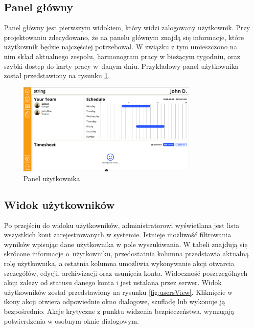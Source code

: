 \subsection{Panel główny}

Panel główny jest pierwszym widokiem, który widzi zalogowany użytkownik. Przy projektowaniu zdecydowano, że na panelu głównym znajdą się informacje, które użytkownik będzie najczęściej potrzebował. W związku z tym umieszczono na nim skład aktualnego zespołu, harmonogram pracy w bieżącym tygodniu, oraz szybki dostęp do karty pracy w~danym dniu. Przykładowy panel użytkownika został przedstawiony na rysunku \ref{fig:userDashboard}.

\begin{figure}[H]
    \centering
    \includegraphics[width=0.8\textwidth, frame]{graf/userDashboard.png}
    \caption{Panel użytkownika}
    \label{fig:userDashboard}
\end{figure}

\subsection{Widok użytkowników}

Po przejściu do widoku użytkowników, administratorowi wyświetlana jest lista wszystkich kont zarejestrowanych w systemie. Istnieje możliwość filtrowania wyników wpisując dane użytkownika w pole wyszukiwania. W tabeli znajdują się skrócone informacje o~użytkowniku, przedostatnia kolumna przedstawia aktualną rolę użytkownika, a ostatnia kolumna umożliwia wykonywanie akcji otwarcia szczegółów, edycji, archiwizacji oraz usunięcia konta. Widoczność poszczególnych akcji zależy od statusu danego konta i jest ustalana przez serwer. Widok użytkowników został przedstawiony na rysunku \ref{fig:usersView}. Kliknięcie w ikony akcji otwiera odpowiednie okno dialogowe, szufladę lub wykonuje ją bezpośrednio. Akcje krytyczne z punktu widzenia bezpieczeństwa, wymagają potwierdzenia w osobnym oknie dialogowym.

